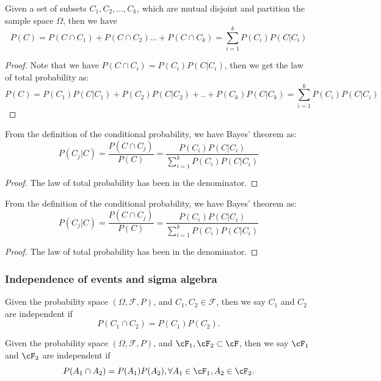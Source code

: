 \begin{refsection}
\begin{lemma}\label{ch:theory-of-probability:th:lawoftotalprobability}
	Given a set of subsets $C_1,C_2,...,C_k$, which are mutual disjoint and partition the sample space $\Omega$, then we have 
	$$P(C) = P(C\cap C_1) + P(C\cap C_2)... + P(C\cap C_k) = \sum_{i=1}^k P(C_i)P(C|C_i)$$
\end{lemma}
\begin{proof}
	Note that we have $P(C\cap C_i) = P(C_i)P(C|C_i)$, then we get the law of total probability as:
	$$P(C) = P(C_1)P(C|C_1) + P(C_2)P(C|C_2)+.. +P(C_k)P(C|C_k) = \sum_{i=1}^k P(C_i)P(C|C_i)$$		
\end{proof}

\begin{theorem}
	From the definition of the conditional probability, we have Bayes' theorem as: 
	$$P(C_j|C) = \frac{P(C\cap C_j)}{P(C)} = \frac{P(C_i)P(C|C_i)}{\sum_{i=1}^k P(C_i)P(C|C_i)}$$	
\end{theorem}
\begin{proof}
	The law of total probability has been in the denominator.
\end{proof}

\begin{theorem}
	From the definition of the conditional probability, we have Bayes' theorem as: 
	$$P(C_j|C) = \frac{P(C\cap C_j)}{P(C)} = \frac{P(C_i)P(C|C_i)}{\sum_{i=1}^k P(C_i)P(C|C_i)}$$	
\end{theorem}
\begin{proof}
	The law of total probability has been in the denominator.
\end{proof}

\subsubsection{Independence of events and sigma algebra}
\begin{definition}
	Given the probability space $(\Omega,\mathcal{F},P)$, and  $C_1,C_2 \in \mathcal{F}$, then we say $C_1$ and $C_2$ are independent if
	$$P(C_1\cap C_2) = P(C_1)P(C_2).$$	
\end{definition}

\begin{definition}
Given the probability space $(\Omega,\mathcal{F},P)$, and  $\cF_1,\cF_2 \subset \cF$, then we say $\cF_1$ and $\cF_2$ are independent if
$$P(A_1\cap A_2) = P(A_1)P(A_2),\forall A_1\in \cF_1,A_2\in \cF_2.$$	
\end{definition}


\end{refsection}
